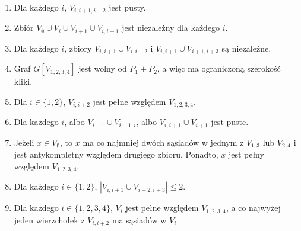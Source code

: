 \documentclass[polish]{beamer}
\begin{document}
\begin{frame}
    \begin{theorem}
        \renewcommand{\qedsymbol}{}
        \begin{enumerate}
            \item Dla każdego $i$, $V_{i,i+1,i+2}$ jest pusty.
            \item Zbiór $V_\emptyset \cup V_i \cup V_{i+1} \cup V_{i,i+1}$ jest niezależny dla każdego $i$.
            \item Dla każdego $i$, zbiory $V_{i,i+1} \cup V_{i,i+2}$ i $V_{i,i+1} \cup V_{i+1,i+3}$ są niezależne.
            \item Graf $G[V_{1,2,3,4}]$ jest wolny od $P_1 + P_2$, a więc ma ograniczoną szerokość kliki.
            \item Dla $i \in \{1,2\}$, $V_{i,i+2}$ jest pełne względem $V_{1,2,3,4}$.
            \item Dla każdego $i$, albo $V_{i-1} \cup V_{i-1,i}$, albo $V_{i,i+1} \cup V_{i+1}$ jest puste.
            \item Jeżeli $x \in V_\emptyset$, to $x$ ma co najmniej dwóch sąsiadów w jednym z $V_{1,3}$ lub $V_{2,4}$ i jest antykompletny względem drugiego zbioru. Ponadto, $x$ jest pełny względem $V_{1,2,3,4}$.
            \item Dla każdego $i \in \{1, 2\}$, $|V_{i,i+1} \cup V_{i+2,i+3}| \leq 2$.
            \item Dla każdego $i \in \{1, 2, 3, 4\}$, $V_i$ jest pełne względem $V_{1,2,3,4}$, a co najwyżej jeden wierzchołek z $V_{i,i+2}$ ma sąsiadów w $V_i$.
        \end{enumerate} 
    \end{theorem}
\end{frame}
\end{document}
